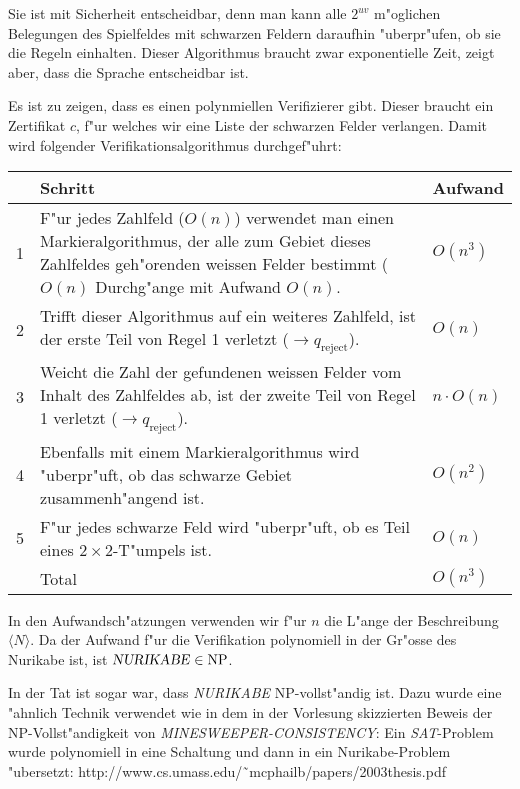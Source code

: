 \begin{loesung}
Sie ist mit Sicherheit entscheidbar, denn man kann alle $2^{uv}$
m"oglichen Belegungen des Spielfeldes mit schwarzen Feldern daraufhin
"uberpr"ufen, ob sie die Regeln einhalten. Dieser Algorithmus braucht
zwar exponentielle Zeit, zeigt aber, dass die Sprache entscheidbar ist.

Es ist zu zeigen, dass es einen polynmiellen Verifizierer gibt. Dieser
braucht ein Zertifikat $c$, f"ur welches wir eine Liste der schwarzen
Felder verlangen. Damit wird folgender Verifikationsalgorithmus
durchgef"uhrt:

\begin{tabular}{rll}
&Schritt&Aufwand\\
\hline
1&\begin{minipage}[t]{4.2truein}\strut
F"ur jedes Zahlfeld ($O(n)$) verwendet man einen Markieralgorithmus,
der alle zum Gebiet dieses Zahlfeldes geh"orenden weissen
Felder bestimmt ($O(n)$ Durchg"ange mit Aufwand
$O(n)$.\strut\end{minipage}&$O(n^3)$\\
2&\begin{minipage}[t]{4.2truein}\strut
Trifft dieser Algorithmus auf ein weiteres
Zahlfeld, ist der erste Teil von Regel 1 verletzt
($\to q_{\text{reject}}$).
\strut\end{minipage}&$O(n)$\\
3&\begin{minipage}[t]{4.2truein}\strut
Weicht die Zahl der gefundenen weissen Felder vom Inhalt des Zahlfeldes
ab, ist der zweite Teil von Regel 1 verletzt
($\to q_{\text{reject}}$).\strut\end{minipage}&$n\cdot O(n)$\\
4&\begin{minipage}[t]{4.2truein}\strut
Ebenfalls mit einem Markieralgorithmus wird "uberpr"uft, ob das
schwarze Gebiet zusammenh"angend ist.
\strut\end{minipage}&$O(n^2)$\\
5&\begin{minipage}[t]{4.2truein}\strut
F"ur jedes schwarze Feld wird "uberpr"uft, ob es Teil eines
$2\times 2$-T"umpels ist.
\strut\end{minipage}&$O(n)$\\
\hline
&Total&$O(n^3)$
\end{tabular}

In den Aufwandsch"atzungen verwenden wir f"ur $n$ die L"ange der
Beschreibung $\langle N\rangle$. Da der Aufwand f"ur die Verifikation
polynomiell in der Gr"osse des Nurikabe ist, ist
$\text{\textsl{NURIKABE}}\in\operatorname{NP}$.

In der Tat ist sogar war, dass \textsl{NURIKABE} NP-vollst"andig
ist. Dazu wurde eine "ahnlich Technik verwendet wie in dem in
der Vorlesung skizzierten Beweis
der NP-Vollst"andigkeit von \textsl{MINESWEEPER-CONSISTENCY}:
Ein \textsl{SAT}-Problem wurde polynomiell in eine Schaltung und dann in
ein Nurikabe-Problem "ubersetzt:
http://www.cs.umass.edu/\~\ mcphailb/papers/2003thesis.pdf
\end{loesung}
